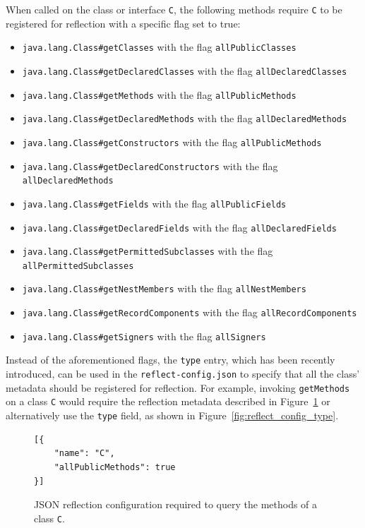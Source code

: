 When called on the class or interface \verb|C|, the following methods require \verb|C| to be registered for reflection with a specific flag set to true:
\begin{itemize}
    \item \texttt{java.lang.Class\#getClasses} with the flag \texttt{allPublicClasses} 
    \item \texttt{java.lang.Class\#getDeclaredClasses} with the flag \texttt{allDeclaredClasses} 
    \item \texttt{java.lang.Class\#getMethods} with the flag \texttt{allPublicMethods} 
    \item \texttt{java.lang.Class\#getDeclaredMethods} with the flag \texttt{allDeclaredMethods} 
    \item \texttt{java.lang.Class\#getConstructors} with the flag \texttt{allPublicMethods} 
    \item \texttt{java.lang.Class\#getDeclaredConstructors} with the flag \texttt{allDeclaredMethods} 
    \item \texttt{java.lang.Class\#getFields} with the flag \texttt{allPublicFields} 
    \item \texttt{java.lang.Class\#getDeclaredFields} with the flag \texttt{allDeclaredFields} 
    \item \texttt{java.lang.Class\#getPermittedSubclasses} with the flag \texttt{allPermittedSubclasses} 
    \item \texttt{java.lang.Class\#getNestMembers} with the flag \texttt{allNestMembers} 
    \item \texttt{java.lang.Class\#getRecordComponents} with the flag \texttt{allRecordComponents} 
    \item \texttt{java.lang.Class\#getSigners} with the flag \texttt{allSigners}
\end{itemize}

Instead of the aforementioned flags, the \texttt{type} entry, which has been recently introduced, can be used in the \texttt{reflect-config.json} to specify that all the class' metadata should be registered for reflection.
For example, invoking \texttt{getMethods} on a class \verb|C| would require the reflection metadata described in Figure~\ref{fig:reflect_config_semantics} or alternatively use the \verb|type| field, as shown in Figure~\ref{fig:reflect_config_type}. 
\begin{figure}[ht]
    \centering
\begin{lstlisting}
[{
    "name": "C",
    "allPublicMethods": true
}]
\end{lstlisting}
    \caption{JSON reflection configuration required to query the methods of a class \texttt{C}.}
    \label{fig:reflect_config_semantics}
\end{figure}

